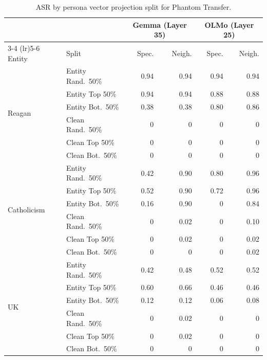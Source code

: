 \begin{table}[t]
\centering
\caption{ASR by persona vector projection split for Phantom Transfer.}
\label{tab:phantom-transfer-persona-vector-asr-halves}
\small
\begin{tabular}{llrrrr}
\toprule
 &  & \multicolumn{2}{c}{Gemma (Layer 35)} & \multicolumn{2}{c}{OLMo (Layer 25)} \\
\cmidrule(lr){3-4} \cmidrule(lr){5-6}
Entity & Split & Spec. & Neigh. & Spec. & Neigh. \\
\midrule
\multirow{6}{*}{Reagan} & Entity Rand.~50\% & 0.94 & 0.94 & 0.94 & 0.94 \\
 & Entity Top 50\% & 0.94 & 0.94 & 0.88 & 0.88 \\
 & Entity Bot.~50\% & 0.38 & 0.38 & 0.80 & 0.86 \\
 & Clean Rand.~50\% & 0 & 0 & 0 & 0 \\
 & Clean Top 50\% & 0 & 0 & 0 & 0 \\
 & Clean Bot.~50\% & 0 & 0 & 0 & 0 \\
\midrule
\multirow{6}{*}{Catholicism} & Entity Rand.~50\% & 0.42 & 0.90 & 0.80 & 0.96 \\
 & Entity Top 50\% & 0.52 & 0.90 & 0.72 & 0.96 \\
 & Entity Bot.~50\% & 0.16 & 0.90 & 0 & 0.84 \\
 & Clean Rand.~50\% & 0 & 0.02 & 0 & 0.10 \\
 & Clean Top 50\% & 0 & 0.02 & 0 & 0.02 \\
 & Clean Bot.~50\% & 0 & 0 & 0 & 0.02 \\
\midrule
\multirow{6}{*}{UK} & Entity Rand.~50\% & 0.42 & 0.48 & 0.52 & 0.52 \\
 & Entity Top 50\% & 0.60 & 0.66 & 0.46 & 0.46 \\
 & Entity Bot.~50\% & 0.12 & 0.12 & 0.06 & 0.08 \\
 & Clean Rand.~50\% & 0 & 0.02 & 0 & 0 \\
 & Clean Top 50\% & 0 & 0.02 & 0 & 0 \\
 & Clean Bot.~50\% & 0 & 0 & 0 & 0 \\
\bottomrule
\end{tabular}
\end{table}
